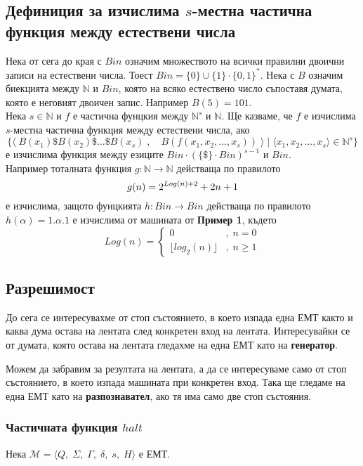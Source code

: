 \documentclass[14pt]{extarticle}
\begin{document}
\subsection*{Дефиниция за изчислима \(s\)-местна частична функция между естествени числа}
Нека от сега до края с \(Bin\) означим множеството на всички правилни двоични записи на естествени числа.
Тоест \(Bin = \{0\} \cup \{1\} \cdot \{0, 1\}^*\). Нека с \(B\) означим биекцията между \(\mathbb N\) и \(Bin\),
която на всяко естествено число съпоставя думата, която е неговият двоичен запис.
Например \(B(5) = 101\). \\

Нека \(s \in \mathbb N\) и \(f\) е частична фунцкия между \(\mathbb{N}^s\) и \(\mathbb N\).
Ще казваме, че \(f\) е изчислима \(s\)-местна частична функция между естествени числа, ако
\[ \{ \langle \; B(x_1) \$ B(x_2) \$ \dots \$ B(x_s) \; , \quad B( f(x_1, x_2, \dots, x_s) ) \;  \rangle \mid \langle x_1, x_2, \dots, x_s \rangle \in \mathbb N^s  \} \]
е изчислима функция между езиците \( Bin \cdot (\{\$\} \cdot Bin)^{s - 1} \) и \(Bin\). \\

Например тоталната функция \(g : \mathbb N \to \mathbb N\) действаща по правилото
\[ g(n) = \Large{2^{Log(n) + 2} + 2n + 1 } \]
е изчислима, защото фунцкията \(h : Bin \to Bin\) действаща по правилото \(h(\alpha) = 1.\alpha.1\) е изчислима от машината от \textbf{Пример 1}, където
\[ Log(n) = \begin{cases}
    0 &,\; n = 0 \\
    \lfloor log_2(n) \rfloor &,\; n \geq 1
\end{cases} \]

\subsection*{Разрешимост}
До сега се интересувахме от стоп състоянието, в което изпада една ЕМТ както и каква дума остава на лентата след конкретен вход на лентата. Интересувайки се от думата, която остава на лентата гледахме на една ЕМТ като на \textbf{генератор}. \\

\par Можем да забравим за резултата на лентата, а да се интересуваме само от стоп състоянието, в което изпада машината при конкретен вход. Така ще гледаме на една ЕМТ като на \textbf{разпознавател}, ако тя има само две стоп състояния.

\subsubsection*{Частичната функция \(halt\)}
Нека \(\mathcal M = \langle Q,\; \Sigma,\; \Gamma,\; \delta,\; s,\; H \rangle\) е ЕМТ.
\end{document}
